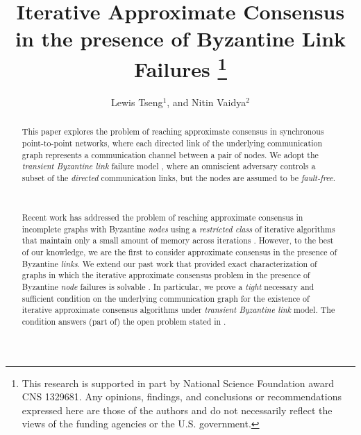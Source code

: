 \documentclass{llncs}
\begin{document}
\title{Iterative Approximate Consensus in the presence of Byzantine Link Failures
\thanks{\normalsize This research is supported in part by National Science Foundation award CNS 1329681. Any opinions, findings, and conclusions or recommendations expressed here are those of the authors and do not necessarily reflect the views of the funding agencies or the U.S. government.}}




\author{Lewis Tseng$^{1}$, and Nitin Vaidya$^{2}$}





\maketitle

\begin{abstract}{\normalfont
This paper explores the problem of reaching approximate consensus in synchronous point-to-point networks, where each directed link of the underlying communication graph represents a communication channel between a pair of nodes. We adopt the {\em transient Byzantine link} failure model \cite{Santoro_link,Santoro_link2}, where an omniscient adversary controls a subset of the {\em directed} communication links, but the nodes are assumed to be {\em fault-free}.

~

Recent work has addressed the problem of reaching approximate consensus in incomplete graphs with Byzantine {\em nodes} using a {\em restricted class} of iterative algorithms that maintain only a small amount of memory across iterations \cite{vaidya_PODC12,Tseng_general,vaidya_icdcn14,Sundaram_condition}. However, to the best of our knowledge, we are the first to consider approximate consensus in the presence of Byzantine {\em links}. We extend our past work that provided exact characterization of graphs in which the iterative approximate consensus problem in the presence of Byzantine {\em node} failures is solvable \cite{vaidya_PODC12,Tseng_general}. In particular, we prove a {\em tight} necessary and sufficient condition on the underlying communication graph for the existence of iterative approximate consensus algorithms under {\em transient Byzantine link} model. The condition answers (part of) the open problem stated in \cite{Santoro_link2}.
}
\end{abstract}
\end{document}
